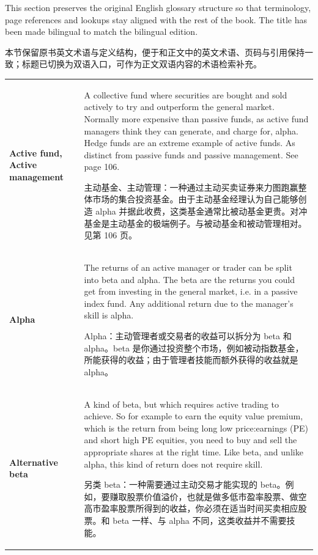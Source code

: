 
\begin{englishblock} This section preserves the original English glossary structure so that terminology, page references and lookups stay aligned with the rest of the book. The title has been made bilingual to match the bilingual edition. \end{englishblock}

\begin{chineseblock} \noindent 本节保留原书英文术语与定义结构，便于和正文中的英文术语、页码与引用保持一致；标题已切换为双语入口，可作为正文双语内容的术语检索补充。\end{chineseblock}

\medskip

\begin{chinesetableblock}
{\small
\setlength{\LTpre}{0pt} \setlength{\LTpost}{0pt} \setlength{\tabcolsep}{4pt} \renewcommand{\arraystretch}{1.1} \begin{longtable}{@{}>{\raggedright\arraybackslash\bfseries} p{}>{\raggedright\arraybackslash} p{}@{}} Active fund, Active management & A collective fund where securities are bought and sold actively to try and outperform the general market. Normally more expensive than passive funds, as active fund managers think they can generate, and charge for, alpha. Hedge funds are an extreme example of active funds. As distinct from passive funds and passive management. See page 106. \par 主动基金、主动管理：一种通过主动买卖证券来力图跑赢整体市场的集合投资基金。由于主动基金经理认为自己能够创造 alpha 并据此收费，这类基金通常比被动基金更贵。对冲基金是主动基金的极端例子。与被动基金和被动管理相对。见第 106 页。 \\[0.65em]
Alpha & The returns of an active manager or trader can be split into beta and alpha. The beta are the returns you could get from investing in the general market, i.e. in a passive index fund. Any additional return due to the manager’s skill is alpha. \par Alpha：主动管理者或交易者的收益可以拆分为 beta 和 alpha。beta 是你通过投资整个市场，例如被动指数基金，所能获得的收益；由于管理者技能而额外获得的收益就是 alpha。 \\[0.65em]
Alternative beta & A kind of beta, but which requires active trading to achieve. So for example to earn the equity value premium, which is the return from being long low price:earnings (PE) and short high PE equities, you need to buy and sell the appropriate shares at the right time. Like beta, and unlike alpha, this kind of return does not require skill. \par 另类 beta：一种需要通过主动交易才能实现的 beta。例如，要赚取股票价值溢价，也就是做多低市盈率股票、做空高市盈率股票所得到的收益，你必须在适当时间买卖相应股票。和 beta 一样、与 alpha 不同，这类收益并不需要技能。 \\[0.65em]

\end{longtable}}
\end{chinesetableblock}
